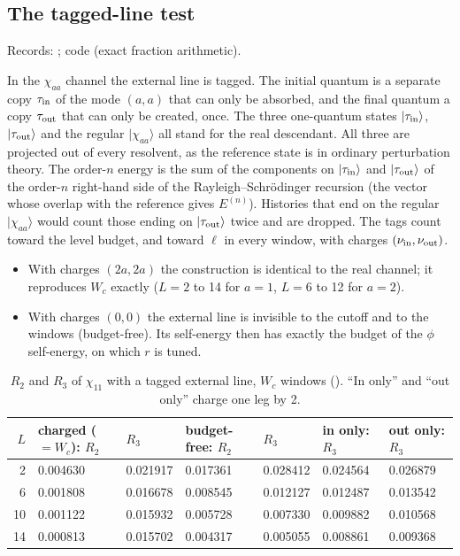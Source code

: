 \subsection{The tagged-line test}\label{htp:d2:app:tag}
{\small\raggedright\noindent Records: ; code
 (exact fraction arithmetic).\par}

In the $\chi_{aa}$ channel the external line is tagged. The initial quantum is a separate copy $\tau_{\rm in}$ of the mode
$(a,a)$ that can only be absorbed, and the final quantum a copy $\tau_{\rm out}$ that can only be created, once. The three
one-quantum states $|\tau_{\rm in}\rangle$, $|\tau_{\rm out}\rangle$ and the regular $|\chi_{aa}\rangle$ all stand for the real
descendant. All three are projected out of every resolvent, as the reference state is in ordinary perturbation theory. The
order-$n$ energy is the sum of the components on $|\tau_{\rm in}\rangle$ and $|\tau_{\rm out}\rangle$ of the order-$n$
right-hand side of the Rayleigh--Schr\"odinger recursion (the vector whose overlap with the reference gives $E^{(n)}$).
Histories that end on the regular $|\chi_{aa}\rangle$ would count those ending on $|\tau_{\rm out}\rangle$ twice and are dropped. The tags count toward the level
budget, and toward $\ell$ in every window, with charges $(\nu_{\rm in},\nu_{\rm out})$.
\begin{itemize}
\item With charges $(2a,2a)$ the construction is identical to the real channel; it reproduces $W_c$ exactly ($L=2$ to 14
 for $a=1$, $L=6$ to 12 for $a=2$).
\item With charges $(0,0)$ the external line is invisible to the cutoff and to the windows (budget-free). Its self-energy
 then has exactly the budget of the $\phi$ self-energy, on which $r$ is tuned.
\end{itemize}

\begin{table}[ht]
\centering\footnotesize\renewcommand{\arraystretch}{1.15}
\begin{tabular}{@{}rllllll@{}}
\toprule
$L$ & charged ($=W_c$): $R_2$ & $R_3$ & budget-free: $R_2$ & $R_3$ & in only: $R_3$ & out only: $R_3$ \\\midrule
2 & 0.004630 & 0.021917 & 0.017361 & 0.028412 & 0.024564 & 0.026879 \\
6 & 0.001808 & 0.016678 & 0.008545 & 0.012127 & 0.012487 & 0.013542 \\
10 & 0.001122 & 0.015932 & 0.005728 & 0.007330 & 0.009882 & 0.010568 \\
14 & 0.000813 & 0.015702 & 0.004317 & 0.005055 & 0.008861 & 0.009368 \\
\bottomrule
\end{tabular}
\caption{$R_2$ and $R_3$ of $\chi_{11}$ with a tagged external line, $W_c$ windows ().
``In only'' and ``out only'' charge one leg by 2.}
\label{htp:d2:tab:tag}
\end{table}

